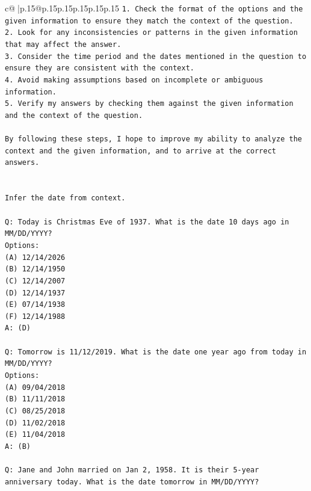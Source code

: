 \documentclass{article}
\begin{document}
{\begin{supertabular}{c@{$\;$}|p{.15\linewidth}@{}p{.15\linewidth}p{.15\linewidth}p{.15\linewidth}p{.15\linewidth}p{.15\linewidth}}
{{{\texttt{1. Check the format of the options and the given information to ensure they match the context of the question.} \\
\texttt{2. Look for any inconsistencies or patterns in the given information that may affect the answer.} \\
\texttt{3. Consider the time period and the dates mentioned in the question to ensure they are consistent with the context.} \\
\texttt{4. Avoid making assumptions based on incomplete or ambiguous information.} \\
\texttt{5. Verify my answers by checking them against the given information and the context of the question.} \\
\\ 
\texttt{By following these steps, I hope to improve my ability to analyze the context and the given information, and to arrive at the correct answers.} \\
\\ 
\\ 
\texttt{Infer the date from context.} \\
\\ 
\texttt{Q: Today is Christmas Eve of 1937. What is the date 10 days ago in MM/DD/YYYY?} \\
\texttt{Options:} \\
\texttt{(A) 12/14/2026} \\
\texttt{(B) 12/14/1950} \\
\texttt{(C) 12/14/2007} \\
\texttt{(D) 12/14/1937} \\
\texttt{(E) 07/14/1938} \\
\texttt{(F) 12/14/1988} \\
\texttt{A: (D)} \\
\\ 
\texttt{Q: Tomorrow is 11/12/2019. What is the date one year ago from today in MM/DD/YYYY?} \\
\texttt{Options:} \\
\texttt{(A) 09/04/2018} \\
\texttt{(B) 11/11/2018} \\
\texttt{(C) 08/25/2018} \\
\texttt{(D) 11/02/2018} \\
\texttt{(E) 11/04/2018} \\
\texttt{A: (B)} \\
\\ 
\texttt{Q: Jane and John married on Jan 2, 1958. It is their 5{-}year anniversary today. What is the date tomorrow in MM/DD/YYYY?} \\
}}}
\end{supertabular}}
\end{document}
